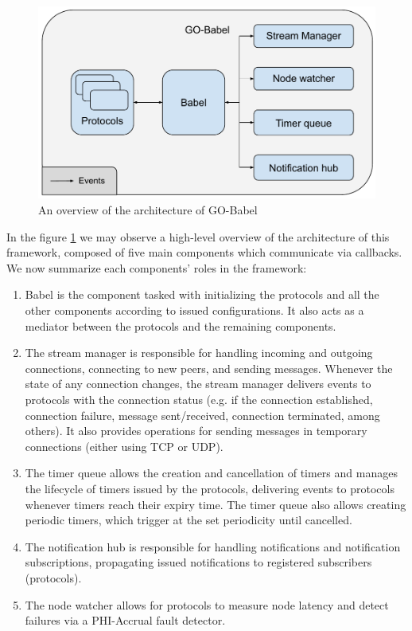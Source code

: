\begin{figure}[htbp]
    \centering
    \includegraphics[width=\textwidth]{Chapters/Figures/Go-Babel-Overview.pdf}
    \caption{An overview of the architecture of GO-Babel}
    \label{fig:go-babel-overview}
\end{figure}

In the figure \ref{fig:go-babel-overview} we may observe a high-level overview of the architecture of this framework, composed of five main components which communicate via callbacks. We now summarize each components' roles in the framework:

\begin{enumerate}

    \item Babel is the component tasked with initializing the protocols and all the other components according to issued configurations. It also acts as a mediator between the protocols and the remaining components.

    \item The stream manager is responsible for handling incoming and outgoing connections, connecting to new peers, and sending messages. Whenever the state of any connection changes, the stream manager delivers events to protocols with the connection status (e.g. if the connection established, connection failure, message sent/received, connection terminated, among others). It also provides operations for sending messages in temporary connections (either using TCP or UDP).

    \item The timer queue allows the creation and cancellation of timers and manages the lifecycle of timers issued by the protocols, delivering events to protocols whenever timers reach their expiry time. The timer queue also allows creating periodic timers, which trigger at the set periodicity until cancelled.

    \item The notification hub is responsible for handling notifications and notification subscriptions, propagating issued notifications to registered subscribers (protocols).

    \item The node watcher allows for protocols to measure node latency and detect failures via a PHI-Accrual fault detector.

\end{enumerate}

